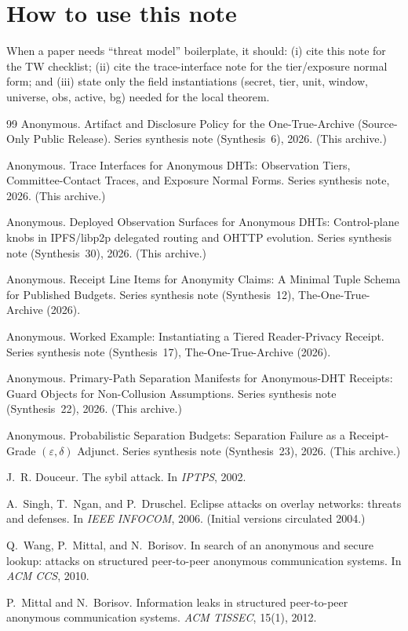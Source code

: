 \documentclass[11pt]{article}
\begin{document}
\section*{How to use this note}
When a paper needs ``threat model'' boilerplate, it should:
(i) cite this note for the TW checklist; (ii) cite the trace-interface note for the tier/exposure normal form; and
(iii) state only the field instantiations (secret, tier, unit, window, universe, obs, active, bg) needed for the local theorem.

\begin{thebibliography}{99}\small
{}
Anonymous.
\newblock Artifact and Disclosure Policy for the One-True-Archive (Source-Only Public Release).
\newblock Series synthesis note (Synthesis~6), 2026. (This archive.)

Anonymous.
\newblock Trace Interfaces for Anonymous DHTs: Observation Tiers, Committee-Contact Traces, and Exposure Normal Forms.
\newblock Series synthesis note, 2026. (This archive.)

Anonymous.
\newblock Deployed Observation Surfaces for Anonymous DHTs: Control-plane knobs in IPFS/libp2p delegated routing and OHTTP evolution.
\newblock Series synthesis note (Synthesis~30), 2026. (This archive.)


Anonymous.
\newblock Receipt Line Items for Anonymity Claims: A Minimal Tuple Schema for Published Budgets.
\newblock Series synthesis note (Synthesis~12), The-One-True-Archive (2026).

Anonymous.
\newblock Worked Example: Instantiating a Tiered Reader-Privacy Receipt.
\newblock Series synthesis note (Synthesis~17), The-One-True-Archive (2026).

Anonymous.
\newblock Primary-Path Separation Manifests for Anonymous-DHT Receipts: Guard Objects for Non-Collusion Assumptions.
\newblock Series synthesis note (Synthesis~22), 2026. (This archive.)

Anonymous.
\newblock Probabilistic Separation Budgets: Separation Failure as a Receipt-Grade $(\varepsilon,\delta)$ Adjunct.
\newblock Series synthesis note (Synthesis~23), 2026. (This archive.)

J.~R. Douceur.
\newblock The sybil attack.
\newblock In \emph{IPTPS}, 2002.

A.~Singh, T.~Ngan, and P.~Druschel.
\newblock Eclipse attacks on overlay networks: threats and defenses.
\newblock In \emph{IEEE INFOCOM}, 2006. (Initial versions circulated 2004.)

Q.~Wang, P.~Mittal, and N.~Borisov.
\newblock In search of an anonymous and secure lookup: attacks on structured peer-to-peer anonymous communication systems.
\newblock In \emph{ACM CCS}, 2010.

P.~Mittal and N.~Borisov.
\newblock Information leaks in structured peer-to-peer anonymous communication systems.
\newblock \emph{ACM TISSEC}, 15(1), 2012.
\end{thebibliography}
\end{document}
